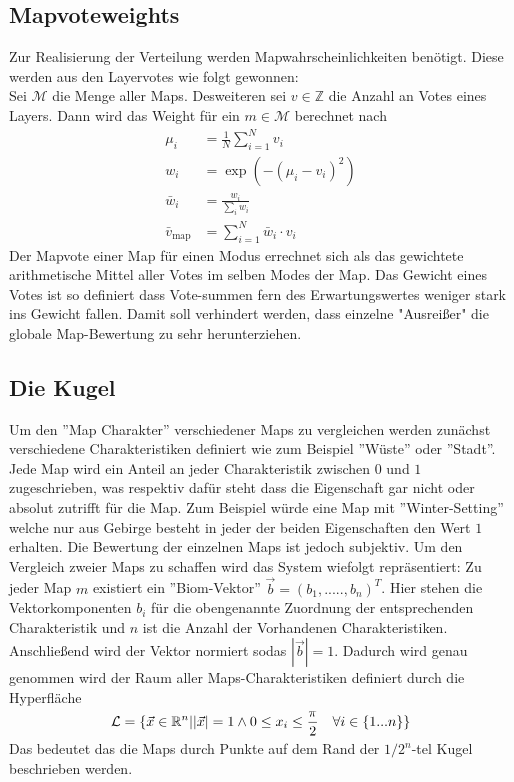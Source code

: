     \subsection{Mapvoteweights}
        Zur Realisierung der Verteilung werden Mapwahrscheinlichkeiten benötigt. 
        Diese werden aus den Layervotes wie folgt gewonnen:\\
        Sei $\mathcal{M}$ die Menge aller Maps. 
        Desweiteren sei $v\in\mathbb{Z}$ die Anzahl an Votes eines Layers.
        Dann wird das Weight für ein $m\in \mathcal{M}$ berechnet nach 
        \begin{align*}
            \mu_i &= \frac{1}{N}\sum_{i=1}^N v_i\\
            w_i &= \exp\left(-(\mu_i-v_i)^2\right)\\
            \bar{w}_i &= \frac{w_i}{\sum_i w_i}\\
            \bar{v}_\text{map} &= \sum_{i=1}^N\bar{w}_i\cdot v_i
        \end{align*}
        Der Mapvote einer Map für einen Modus errechnet sich als das gewichtete arithmetische Mittel aller Votes im selben Modes der Map.
        Das Gewicht eines Votes ist so definiert dass Vote-summen fern des Erwartungswertes weniger stark ins Gewicht fallen.
        Damit soll verhindert werden, dass einzelne "Ausreißer" die globale Map-Bewertung zu sehr herunterziehen.
    \subsection{Die Kugel}
    Um den ''Map Charakter'' verschiedener Maps zu vergleichen werden zunächst verschiedene Charakteristiken definiert wie zum Beispiel ''Wüste'' oder ''Stadt''.
    Jede Map wird ein Anteil an jeder Charakteristik zwischen $0$ und $1$ zugeschrieben, was respektiv dafür steht dass die Eigenschaft gar nicht oder absolut zutrifft für die Map.
    Zum Beispiel würde eine Map mit ''Winter-Setting'' welche nur aus Gebirge besteht in jeder der beiden Eigenschaften den Wert $1$ erhalten. 
    Die Bewertung der einzelnen Maps ist jedoch subjektiv.
    Um den Vergleich zweier Maps zu schaffen wird das System wiefolgt repräsentiert:
    Zu jeder Map $m$ existiert ein ''Biom-Vektor'' $\vec{b} = (b_1,.....,b_n)^T$. 
    Hier stehen die Vektorkomponenten $b_i$ für die obengenannte Zuordnung der entsprechenden Charakteristik und $n$ ist die Anzahl der Vorhandenen Charakteristiken.
    Anschließend wird der Vektor normiert sodas $|\vec{b}|=1$.
    Dadurch wird genau genommen wird der Raum aller Maps-Charakteristiken definiert durch die Hyperfläche
    \begin{equation*}
        \mathcal{L} = \{\vec{x}\in\mathbb{R}^n ||\vec{x}|=1 \land 0\leq x_i \leq \smash{\frac{\pi}{2}} \quad \forall i\in\{1...n\}\}
    \end{equation*}
    Das bedeutet das die Maps durch Punkte auf dem Rand der $1/2^n$-tel Kugel beschrieben werden.

